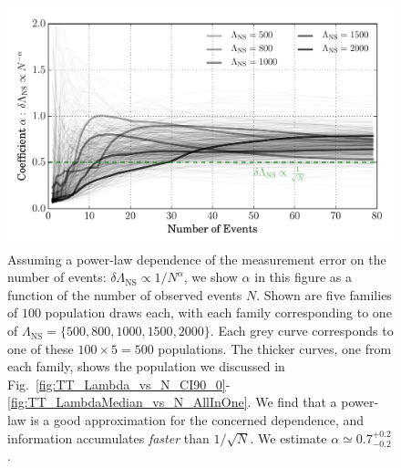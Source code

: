 \documentclass[aps,prd,amsmath,floats,floatfix, twocolumn,
superscriptaddress,nofootinbib,showpacs]{revtex4-1}
\newcommand{\lambdans}{\Lambda_\mathrm{NS}}
\begin{document}
% 
% 
\begin{figure}
\centering    
\includegraphics[width=1.05\columnwidth]{plots/PowerLawCoefficient_LambdaErrorvsN_vs_N.pdf}
\caption{%
Assuming a power-law dependence of the measurement error on the number of
events: $\delta\lambdans\propto 1/N^\alpha$, we show $\alpha$ in this figure
as a function of the number of observed events $N$. Shown are five families
of $100$ population draws each, with each family corresponding to one of
$\lambdans=\{500,800,1000,1500,2000\}$. Each grey curve corresponds to one
of these $100\times5 = 500$ populations. The thicker curves, one from each
family, shows the population we discussed in
Fig.~\ref{fig:TT_Lambda_vs_N_CI90_0}-\ref{fig:TT_LambdaMedian_vs_N_AllInOne}.
We find that a power-law is a good approximation for the concerned dependence,
and information accumulates {\it faster} than $1/\sqrt{N}$. We estimate
$\alpha\simeq 0.7^{+0.2}_{-0.2}$.
}
\label{fig:TT_PowerLawLambdaErrorVsN}
\end{figure}
\end{document}
